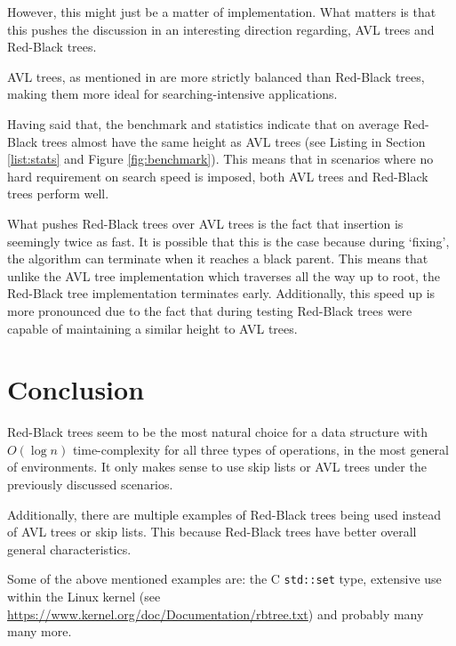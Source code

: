 \documentclass[article]{uom-coursework}
\def\CC{{C\nolinebreak\raisebox{.25ex}{\scriptsize\bfseries{++}}}}
\begin{document}
However, this might just be a matter of implementation. What
matters is that this pushes the discussion in an interesting
direction regarding, AVL trees and Red-Black trees.

AVL trees, as mentioned in \textcite{wikiavltree} are
more strictly balanced than Red-Black trees, making
them more ideal for searching-intensive applications.

Having said that, the benchmark and statistics indicate that on
average Red-Black trees almost have the same height as AVL trees
(see Listing in Section \ref{list:stats} and Figure
\ref{fig:benchmark}). This means that in scenarios where no hard
requirement on search speed is imposed, both AVL trees and
Red-Black trees perform well.

What pushes Red-Black trees over AVL trees is the fact that
insertion is seemingly twice as fast. It is possible that this
is the case because during `fixing', the algorithm can terminate
when it reaches a black parent. This means that unlike the AVL
tree implementation which traverses all the way up to root, the
Red-Black tree implementation terminates early. Additionally,
this speed up is more pronounced due to the fact that during
testing Red-Black trees were capable of maintaining a similar
height to AVL trees.

\section{Conclusion}

Red-Black trees seem to be the most natural choice for a data
structure with $O(\log n)$ time-complexity for all three types
of operations, in the most general of environments. It only
makes sense to use skip lists or AVL trees under the previously
discussed scenarios. 

Additionally, there are multiple examples of Red-Black trees
being used instead of AVL trees or skip lists. This because
Red-Black trees have better overall general characteristics.

Some of the above mentioned examples are: the \CC{}
\texttt{std::set} type, extensive use within the Linux kernel
(see \url{https://www.kernel.org/doc/Documentation/rbtree.txt})
and probably many many more.

\printbibliography
\end{document}
